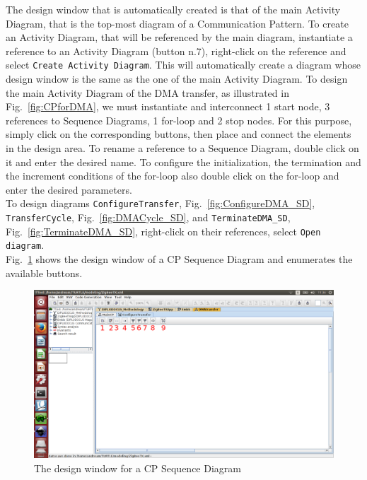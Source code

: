 \documentclass{llncs}
\newcommand{\screenshotsize}{1.0\textwidth}
\begin{document}
%
The design window that is automatically created is that of the main Activity Diagram, that is the top-most diagram of a
Communication Pattern. To create an Activity Diagram, that will be referenced by the main diagram, instantiate a reference
to an Activity Diagram (button n.7), right-click on the reference and select \texttt{Create Activity Diagram}. This will
automatically create a diagram whose design window is the same as the one of the main Activity Diagram.
%
To design the main Activity Diagram of the DMA transfer, as illustrated in Fig.~\ref{fig:CPforDMA}, we must instantiate
and interconnect 1 start node, 3 references to Sequence Diagrams, 1 for-loop and 2 stop nodes. For this purpose, simply
click on the corresponding buttons, then place and connect the elements in the design area. To rename a reference to a
Sequence Diagram, double click on it and enter the desired name. To configure the initialization, the termination and
the increment conditions of the for-loop also double click on the for-loop and enter the desired parameters.\\
%
To design diagrams \texttt{ConfigureTransfer}, Fig.~\ref{fig:ConfigureDMA_SD}, \texttt{TransferCycle},
Fig.~\ref{fig:DMACycle_SD}, and \texttt{TerminateDMA\_SD}, Fig.~\ref{fig:TerminateDMA_SD}, right-click on their references,
select \texttt{Open diagram}.\\
%
Fig.~\ref{fig:CPSDWindow1} shows the design window of a CP Sequence Diagram and enumerates the available buttons.
%
\begin{figure}[!htbp]
	\centering
	\includegraphics[width=\screenshotsize]{figures/screenshot/CPSDWindow1.png}
	\caption{The design window for a CP Sequence Diagram}
	\label{fig:CPSDWindow1}
\end{figure}
%
\end{document}
